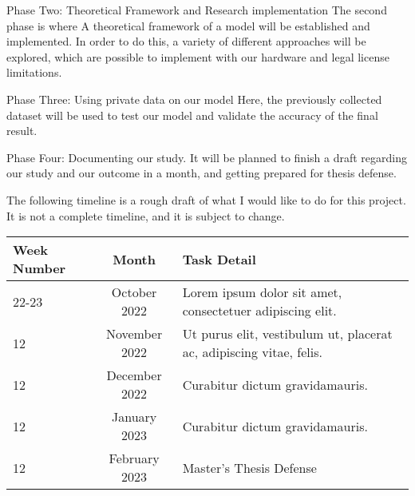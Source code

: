 Phase Two: Theoretical Framework and Research implementation
The second phase is where A theoretical framework of a model will be established and implemented. In order to do this, a variety of different approaches will be explored, which are possible to implement with our hardware and legal license limitations.

Phase Three: Using private data on our model
Here, the previously collected dataset will be used to test our model and validate the accuracy of the final result.

Phase Four: Documenting our study.
It will be planned to finish a draft regarding our study and our outcome in a month, and getting prepared for thesis defense.

The following timeline is a rough draft of what I would like to do for this project. It is not a complete timeline, and it is subject to change.


\begin{tabular}{||l|c|p{9.5cm}|}
    \cline{1-3}
    
    Week Number & Month & Task Detail \\
    \hline \hline
    22-23 & October 2022 & Lorem ipsum dolor sit amet, consectetuer adipiscing elit. \\
    \hline
    12 & November 2022 &  Ut purus elit, vestibulum ut, placerat ac, adipiscing vitae, felis. \\
    \hline
    12 & December 2022 & Curabitur dictum gravidamauris. \\
    \hline
    12 & January 2023 & Curabitur dictum gravidamauris. \\ [.3cm]
   \hline
    12 & February 2023 & Master's Thesis Defense \\ [.3cm]
    \cline{1-3}
\end{tabular}

\newpage
